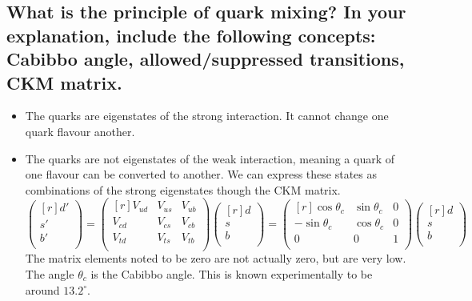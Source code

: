 \documentclass{article}
\begin{document}
\subsection{What is the principle of quark mixing? In your explanation, include the following concepts: Cabibbo angle, allowed/suppressed transitions, CKM matrix.}
\begin{itemize}
    \item The quarks are eigenstates of the strong interaction. It cannot change one quark flavour another. 
    \item The quarks are not eigenstates of the weak interaction, meaning a quark of one flavour can be converted to another. We can express these states as combinations of the strong eigenstates though the CKM matrix. 
    \begin{equation}
      \begin{pmatrix*}[r]
       d' \\
       s' \\
       b' \\
      \end{pmatrix*} = 
      \begin{pmatrix*}[r]
       V_{ud} & V_{us} & V_{ub} \\
       V_{cd} & V_{cs} & V_{cb} \\
       V_{td} & V_{ts} & V_{tb} \\
      \end{pmatrix*}
      \begin{pmatrix*}[r]
       d \\
       s \\
       b \\
      \end{pmatrix*} = 
      \begin{pmatrix*}[r]
       \cos θ_c & \sin θ_c & 0 \\
       -\sin θ_c & \cos θ_c & 0 \\
       0 & 0 & 1 \\
      \end{pmatrix*} 
      \begin{pmatrix*}[r]
       d \\
       s \\
       b \\
      \end{pmatrix*}
    \end{equation}
    The matrix elements noted to be zero are not actually zero, but are very low. The angle $θ_c$ is the Cabibbo angle. This is known experimentally to be around $13.2^∘$. 

\end{itemize}
\end{document}
